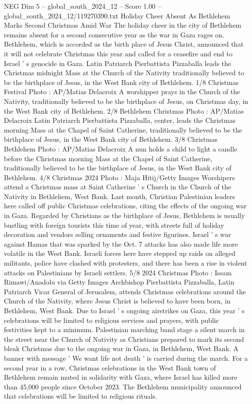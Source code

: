 \begin{textsample}{NEG Dim 5 – global\_south\_2024\_12 – Score 1.00 – global\_south\_2024\_12/119270390.txt}  \label{ex:f5_neg_403}
Holiday Cheer Absent As Bethlehem Marks Second Christmas Amid War The holiday cheer in the city of Bethlehem remains absent for a second consecutive year as the war in Gaza rages on.
Bethlehem, which is accorded as the birth place of Jesus Christ, announced that it will not celebrate Christmas this year and called for a ceasefire and end to Israel ' s genocide in Gaza.
Latin Patriarch Pierbattista Pizzaballa leads the Christmas midnight Mass at the Church of the Nativity traditionally believed to be the birthplace of Jesus, in the West Bank city of Bethlehem. 1/8 Christmas Festival Photo : AP/Matias Delacroix A worshipper prays in the Church of the Nativity, traditionally believed to be the birthplace of Jesus, on Christmas day, in the West Bank city of Bethlehem. 2/8 Bethlehem Christmas Photo : AP/Matias Delacroix Latin Patriarch Pierbattista Pizzaballa, center, leads the Christmas morning Mass at the Chapel of Saint Catherine, traditionally believed to be the birthplace of Jesus, in the West Bank city of Bethlehem. 3/8 Christmas Bethlehem Photo : AP/Matias Delacroix A nun holds a child to light a candle before the Christmas morning Mass at the Chapel of Saint Catherine, traditionally believed to be the birthplace of Jesus, in the West Bank city of Bethlehem. 4/8 Christmas 2024 Photo : Maja Hitij/Getty Images Worshipers attend a Christmas mass at Saint Catherine ' s Church in the Church of the Nativity in Bethlehem, West Bank.
Last month, Christian Palestinian leaders here called off public Christmas celebrations, citing the effects of the ongoing war in Gaza.
Regarded by Christians as the birthplace of Jesus, Bethlehem is usually bustling with foreign tourists this time of year, with streets full of holiday decoration and vendors selling ornaments and festive figurines.
Israel ' s war against Hamas that was sparked by the Oct. 7 attacks has also made life more volatile in the West Bank.
Israeli forces here have stepped up raids on alleged militants, police have clashed with protesters, and there has been a rise in violent attacks on Palestinians by Israeli settlers. 5/8 2024 Christmas Photo : Issam Rimawi/Anadolu via Getty Images Archbishop Pierbattista Pizzaballa, Latin Patriarch Vicar General of Jerusalem, attends Christmas celebrations around the Church of the Nativity, where Jesus Christ is believed to have been born, in Bethlehem, West Bank.
Due to Israel ' s ongoing airstrikes on Gaza, this year ' s celebrations will be limited to religious services and prayers, with public festivities kept to a minimum.
Palestinian marching band stage a silent march in the street near the Church of Nativity as Christians prepared to mark its second bleak Christmas due to the ongoing war in Gaza, in Bethlehem, West Bank.
A banner with message ' We want life not death ' is carried during the march.
For a second year in a row, Christmas celebrations in the West Bank town of Bethlehem remain muted in solidarity with Gaza, where Israel has killed more than 45,000 people since October 2023.
The Bethlehem municipality announced that celebrations will be limited to religious rituals.

\end{textsample}
